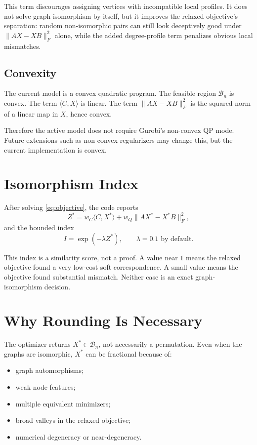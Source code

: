 \documentclass[11pt]{article}
\begin{document}
This term discourages assigning vertices with incompatible local profiles.
It does not solve graph isomorphism by itself, but it improves the relaxed
objective's separation: random non-isomorphic pairs can still look deceptively
good under $\|AX-XB\|_F^2$ alone, while the added degree-profile term penalizes
obvious local mismatches.

\subsection{Convexity}

The current model is a convex quadratic program.
The feasible region $\mathcal{B}_n$ is convex.
The term $\langle C,X\rangle$ is linear.
The term $\|AX-XB\|_F^2$ is the squared norm of a linear map in $X$, hence
convex.

Therefore the active model does not require Gurobi's non-convex QP mode.
Future extensions such as non-convex regularizers may change this, but the
current implementation is convex.

\section{Isomorphism Index}

After solving \eqref{eq:objective}, the code reports
\begin{equation}
    Z^* =
    w_C\langle C,X^*\rangle
    +
    w_Q\|AX^*-X^*B\|_F^2,
\end{equation}
and the bounded index
\begin{equation}
    I=\exp(-\lambda Z^*),
    \qquad \lambda=0.1 \text{ by default}.
\end{equation}

This index is a similarity score, not a proof.
A value near $1$ means the relaxed objective found a very low-cost soft
correspondence.
A small value means the objective found substantial mismatch.
Neither case is an exact graph-isomorphism decision.

\section{Why Rounding Is Necessary}

The optimizer returns $X^*\in\mathcal{B}_n$, not necessarily a permutation.
Even when the graphs are isomorphic, $X^*$ can be fractional because of:
\begin{itemize}[leftmargin=*]
    \item graph automorphisms;
    \item weak node features;
    \item multiple equivalent minimizers;
    \item broad valleys in the relaxed objective;
    \item numerical degeneracy or near-degeneracy.
\end{itemize}
\end{document}

